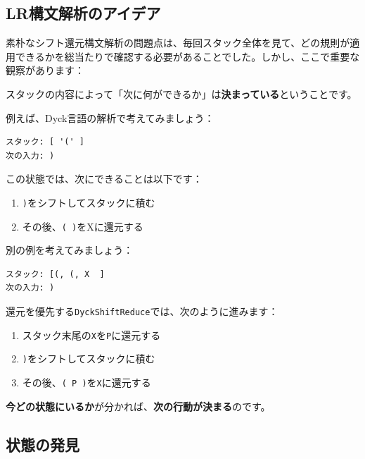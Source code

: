 \hypertarget{chapter5-lrux69cbux6587ux89e3ux6790ux306eux30a2ux30a4ux30c7ux30a2}{%
\subsection{LR構文解析のアイデア}\label{chapter5-lrux69cbux6587ux89e3ux6790ux306eux30a2ux30a4ux30c7ux30a2}}

素朴なシフト還元構文解析の問題点は、毎回スタック全体を見て、どの規則が適用できるかを総当たりで確認する必要があることでした。しかし、ここで重要な観察があります：

スタックの内容によって「次に何ができるか」は\textbf{決まっている}ということです。

例えば、Dyck言語の解析で考えてみましょう：

\begin{verbatim}
スタック: [ '(' ]
次の入力: )
\end{verbatim}

この状態では、次にできることは以下です：

\begin{enumerate}
\def\labelenumi{\arabic{enumi}.}
\tightlist
\item
  \texttt{)}をシフトしてスタックに積む
\item
  その後、\texttt{(\ )}をXに還元する
\end{enumerate}

別の例を考えてみましょう：

\begin{verbatim}
スタック: [(, (, X  ]
次の入力: )
\end{verbatim}

還元を優先する\texttt{DyckShiftReduce}では、次のように進みます：

\begin{enumerate}
\def\labelenumi{\arabic{enumi}.}
\tightlist
\item
  スタック末尾の\texttt{X}を\texttt{P}に還元する
\item
  \texttt{)}をシフトしてスタックに積む
\item
  その後、\texttt{(\ P\ )}を\texttt{X}に還元する
\end{enumerate}

\textbf{今どの状態にいるか}が分かれば、\textbf{次の行動が決まる}のです。

\hypertarget{chapter5-ux72b6ux614bux306eux767aux898b}{%
\subsection{状態の発見}\label{chapter5-ux72b6ux614bux306eux767aux898b}}

